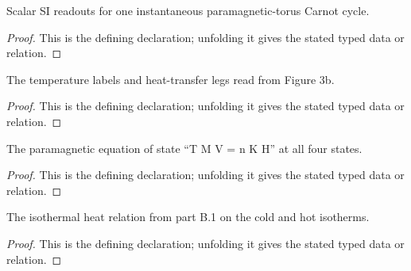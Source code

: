 \begin{definition}[MagneticCarnotCycle]
  \label{decl:physics:IPhO_2026_3_C_5:MagneticCarnotCycle}
  Scalar SI readouts for one instantaneous paramagnetic-torus Carnot cycle.
\end{definition}
\begin{proof}
  This is the defining declaration; unfolding it gives the stated typed data or relation.
\end{proof}

\begin{definition}[FollowsFigureThreeB]
  \label{decl:physics:IPhO_2026_3_C_5:FollowsFigureThreeB}
  The temperature labels and heat-transfer legs read from Figure 3b.
\end{definition}
\begin{proof}
  This is the defining declaration; unfolding it gives the stated typed data or relation.
\end{proof}

\begin{definition}[SatisfiesParamagneticEquationOfState]
  \label{decl:physics:IPhO_2026_3_C_5:SatisfiesParamagneticEquationOfState}
  The paramagnetic equation of state “T M V = n K H” at all four states.
\end{definition}
\begin{proof}
  This is the defining declaration; unfolding it gives the stated typed data or relation.
\end{proof}

\begin{definition}[SatisfiesIsothermalHeatRelation]
  \label{decl:physics:IPhO_2026_3_C_5:SatisfiesIsothermalHeatRelation}
  The isothermal heat relation from part B.1 on the cold and hot isotherms.
\end{definition}
\begin{proof}
  This is the defining declaration; unfolding it gives the stated typed data or relation.
\end{proof}


